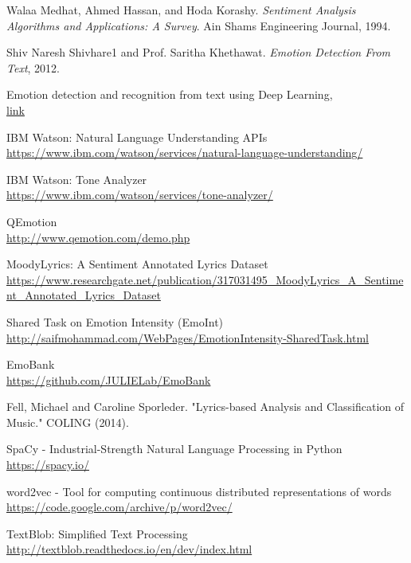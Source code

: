 





\begin{thebibliography}{9}
Walaa Medhat, Ahmed Hassan, and Hoda Korashy. \textit{Sentiment Analysis Algorithms and Applications: A Survey}. Ain Shams Engineering Journal, 1994.
 
Shiv Naresh Shivhare1 and Prof. Saritha Khethawat. \textit{Emotion Detection From Text}, 2012.

 
Emotion detection and recognition from text using Deep Learning,
\\\href{https://www.microsoft.com/developerblog/2015/11/29/emotion-detection-and-recognition-from-text-using-deep-learning/}{link}

 
IBM Watson: Natural Language Understanding APIs
\\\footnotesize \url{https://www.ibm.com/watson/services/natural-language-understanding/}

IBM Watson: Tone Analyzer
\\\footnotesize \url{https://www.ibm.com/watson/services/tone-analyzer/}

QEmotion
\\\footnotesize \url{http://www.qemotion.com/demo.php}

MoodyLyrics: A Sentiment Annotated Lyrics Dataset
\\\footnotesize \url{https://www.researchgate.net/publication/317031495_MoodyLyrics_A_Sentiment_Annotated_Lyrics_Dataset}

Shared Task on Emotion Intensity (EmoInt)
\\\footnotesize \url{http://saifmohammad.com/WebPages/EmotionIntensity-SharedTask.html}

EmoBank
\\\footnotesize \url{https://github.com/JULIELab/EmoBank}

Fell, Michael and Caroline Sporleder. "Lyrics-based Analysis and Classification of Music." COLING (2014).

SpaCy - Industrial-Strength Natural Language Processing in Python
\\\footnotesize \url{https://spacy.io/}

word2vec - Tool for computing continuous distributed representations of words
\\\footnotesize \url{https://code.google.com/archive/p/word2vec/}

TextBlob: Simplified Text Processing
\\\footnotesize \url{http://textblob.readthedocs.io/en/dev/index.html}

\end{thebibliography}
 


              